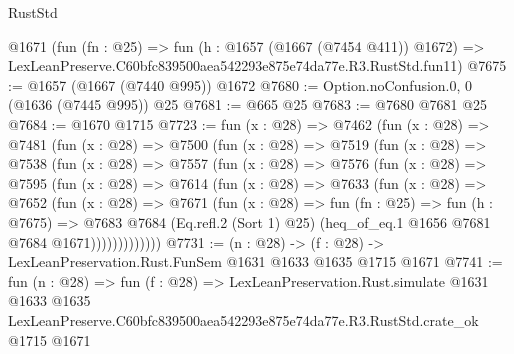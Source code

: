 \begin{lexlean}{RustStd}
\begin{coremodule}
    @1671
    (fun (fn : @25) =>
    fun (h : @1657 (@1667 (@7454 @411)) @1672) =>
    LexLeanPreserve.C60bfc839500aea542293e875e74da77e.R3.RustStd.fun11)
@7675 := @1657 (@1667 (@7440 @995)) @1672
@7680 := Option.noConfusion.{0, 0} (@1636 (@7445 @995)) @25
@7681 := @665 @25
@7683 := @7680 @7681 @25
@7684 := @1670 @1715
@7723 := fun (x : @28) =>
  @7462
    (fun (x : @28) =>
    @7481
      (fun (x : @28) =>
      @7500
        (fun (x : @28) =>
        @7519
          (fun (x : @28) =>
          @7538
            (fun (x : @28) =>
            @7557
              (fun (x : @28) =>
              @7576
                (fun (x : @28) =>
                @7595
                  (fun (x : @28) =>
                  @7614
                    (fun (x : @28) =>
                    @7633
                      (fun (x : @28) =>
                      @7652
                        (fun (x : @28) =>
                        @7671
                          (fun (x : @28) =>
                          fun (fn : @25) =>
                          fun (h : @7675) =>
                          @7683
                            @7684
                            (Eq.refl.{2} (Sort 1) @25)
                            (heq_of_eq.{1} @1656 @7681 @7684 @1671)))))))))))))
@7731 := (n : @28) -> (f : @28) -> LexLeanPreservation.Rust.FunSem @1631 @1633 @1635 @1715 @1671
@7741 := fun (n : @28) =>
  fun (f : @28) =>
  LexLeanPreservation.Rust.simulate
    @1631
    @1633
    @1635
    LexLeanPreserve.C60bfc839500aea542293e875e74da77e.R3.RustStd.crate_ok
    @1715
    @1671
\end{coremodule}
\end{lexlean}
